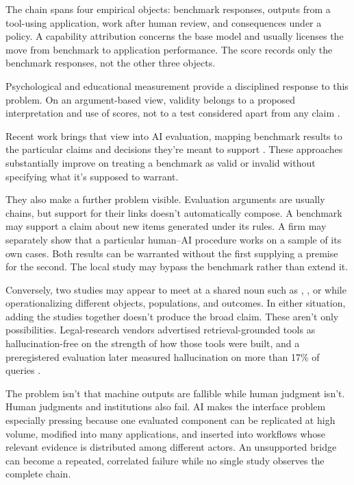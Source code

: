 \documentclass[12pt]{article}
\begin{document}
The chain spans four empirical objects: benchmark responses, outputs from a tool-using application, work after human review, and consequences under a policy. A capability attribution concerns the base model and usually licenses the move from benchmark to application performance. The score records only the benchmark responses, not the other three objects.

Psychological and educational measurement provide a disciplined response to this problem. On an argument-based view, validity belongs to a proposed interpretation and use of scores, not to a test considered apart from any claim \citep{messick1995Validity,kane2013validating}.

Recent work brings that view into AI evaluation, mapping benchmark results to the particular claims and decisions they're meant to support \citep{salaudeen2025measurement,bean2025measuring,freieslebenZezulka2025benchmarking}. These approaches substantially improve on treating a benchmark as valid or invalid without specifying what it's supposed to warrant.

They also make a further problem visible. Evaluation arguments are usually chains, but support for their links doesn't automatically compose. A benchmark may support a claim about new items generated under its rules. A firm may separately show that a particular human--AI procedure works on a sample of its own cases. Both results can be warranted without the first supplying a premise for the second. The local study may bypass the benchmark rather than extend it.

Conversely, two studies may appear to meet at a shared noun such as , , or  while operationalizing different objects, populations, and outcomes. In either situation, adding the studies together doesn't produce the broad claim. These aren't only possibilities. Legal-research vendors advertised retrieval-grounded tools as hallucination-free on the strength of how those tools were built, and a preregistered evaluation later measured hallucination on more than 17\% of queries \citep{magesh2025legalhallucination}.

The problem isn't that machine outputs are fallible while human judgment isn't. Human judgments and institutions also fail. AI makes the interface problem especially pressing because one evaluated component can be replicated at high volume, modified into many applications, and inserted into workflows whose relevant evidence is distributed among different actors. An unsupported bridge can become a repeated, correlated failure while no single study observes the complete chain.
\end{document}
